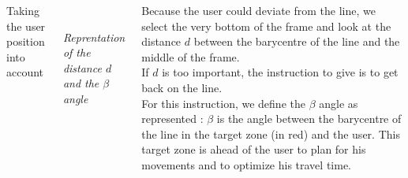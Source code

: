 \documentclass[17pt, a1paper, portrait]{tikzposter}
\begin{document}
\begin{columns}
{%

\begin{center} \LARGE {Taking the user position into account}
\end{center}

\begin{center}
\\
\centering
\caption{\emph{Reprentation of the distance \(d\) and the \(\beta\) angle}}
\end{center}

Because the user could deviate from the line, we select the very bottom of the frame and look at the distance \(d\) between the barycentre of the line and the middle of the frame.
\\
If \(d\) is too important, the instruction to give is to get back on the line.\\
For this instruction, we define the \(\beta\) angle as represented :
\(\beta\) is the angle between the barycentre of the line in the target zone (in red) and the user.
This target zone is ahead of the user to plan for his movements and to optimize his travel time.






}


\end{columns}
\end{document}
